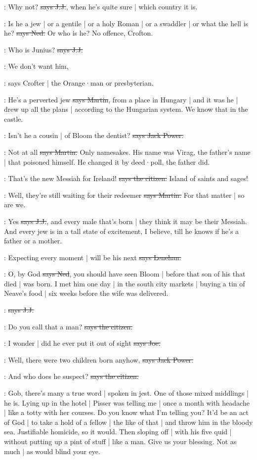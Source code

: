 \jjom:
Why not?
\sout{says J.J.},
when he's quite sure |
which country it is.

\lambert:
Is he a jew |
or a gentile |
or a holy Roman |
or a swaddler |
or what the hell is he?
\sout{says Ned.}
Or who is he?
No offence,
Crofton.

\jjom:
Who is Junius?
\sout{says J.J.}

\crofton:
We don't want him,

\Nq:
says Crofter |
the Orange·man or presbyterian.

\cunningham:
He's a perverted jew
\sout{says Martin},
from a place in Hungary |
and it was he |
drew up all the plans |
according to the Hungarian system.
We know that in the castle.

\power:
Isn't he a cousin |
of Bloom the dentist?
\sout{says Jack Power.}

\cunningham:
Not at all
\sout{says Martin.}
Only namesakes.
His name was Virag,
the father's name |
that poisoned himself.
He changed it by deed·poll,
the father did.

\citizen:
That's the new Messiah for Ireland!
\sout{says the citizen.}
Island of saints and sages!

\cunningham:
Well,
they're still waiting for their redeemer
\sout{says Martin.}
For that matter |
so are we.

\jjom:
Yes
\sout{says J.J.},
and every male that's born |
they think it may be their Messiah.
And every jew is in a tall state of excitement,
I believe,
till he knows if he's a father or a mother.

\lenehan:
Expecting every moment |
will be his next
\sout{says Lenehan.}

\lambert:
O,
by God
\sout{says Ned},
you should have seen Bloom |
before that son of his that died |
was born.
I met him one day |
in the south city markets |
buying a tin of Neave's food |
six weeks before the wife was delivered.

\jjom:
\sout{says J.J.}

\citizen:
Do you call that a man?
\sout{says the citizen.}

\joe:
I wonder |
did he ever put it out of sight
\sout{says Joe.}

\power:
Well,
there were two children born anyhow,
\sout{says Jack Power.}

\citizen:
And who does he suspect?
\sout{says the citizen.}

\Nq:
Gob,
there's many a true word |
spoken in jest.
One of those mixed middlings |
he is.
Lying up in the hotel |
Pisser was telling me |
once a month with headache |
like a totty with her courses.
Do you know what I'm telling you?
It'd be an act of God |
to take a hold of a fellow |
the like of that |
and throw him in the bloody sea.
Justifiable homicide,
so it would.
Then sloping off |
with his five quid |
without putting up a pint of stuff |
like a man.
Give us your blessing.
Not as much |
as would blind your eye.

